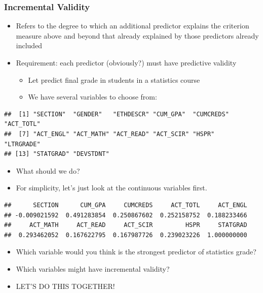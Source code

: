 \documentclass[dvipsnames]{beamer}\usepackage[]{graphicx}\usepackage[]{color}
\makeatletter
\newenvironment{kframe}{%
 \def\at@end@of@kframe{}%
 \ifinner\ifhmode%
  \def\at@end@of@kframe{\end{minipage}}%
  \begin{minipage}{\columnwidth}%
 \fi\fi%
 \def\FrameCommand##1{\hskip\@totalleftmargin \hskip-\fboxsep
 \colorbox{shadecolor}{##1}\hskip-\fboxsep
     \hskip-\linewidth \hskip-\@totalleftmargin \hskip\columnwidth}%
 \MakeFramed {\advance\hsize-\width
   \@totalleftmargin\z@ \linewidth\hsize
   \@setminipage}}%
 {\par\unskip\endMakeFramed%
 \at@end@of@kframe}
\newenvironment{knitrout}{}{} %
\makeatother
\begin{document}
\begin{frame}[fragile]
\frametitle{Incremental Validity}
\begin{itemize}
  \item Refers to the degree to which an additional predictor explains the criterion measure above and beyond that already explained by those predictors already included
  \item Requirement: each predictor (obviously?) must have predictive validity
    \begin{itemize}
      \item Let predict final grade in students in a statistics course
      \item We have several variables to choose from:
    \end{itemize}
\end{itemize}
\begin{knitrout}\scriptsize
{}\color{fgcolor}\begin{kframe}
\begin{verbatim}
##  [1] "SECTION"  "GENDER"   "ETHDESCR" "CUM_GPA"  "CUMCREDS" "ACT_TOTL"
##  [7] "ACT_ENGL" "ACT_MATH" "ACT_READ" "ACT_SCIR" "HSPR"     "LTRGRADE"
## [13] "STATGRAD" "DEVSTDNT"
\end{verbatim}
\end{kframe}
\end{knitrout}
\begin{itemize}
  \item What should we do?
\end{itemize}
\end{frame}

\begin{frame}[fragile]
\begin{itemize}
\item For simplicity, let's just look at the continuous variables first.
\end{itemize}
\begin{knitrout}\scriptsize
{}\color{fgcolor}\begin{kframe}
\begin{verbatim}
##      SECTION      CUM_GPA     CUMCREDS     ACT_TOTL     ACT_ENGL 
## -0.009021592  0.491283854  0.250867602  0.252158752  0.188233466 
##     ACT_MATH     ACT_READ     ACT_SCIR         HSPR     STATGRAD 
##  0.293462052  0.167622795  0.167987726  0.239023226  1.000000000
\end{verbatim}
\end{kframe}
\end{knitrout}
\begin{itemize}
\item Which variable would you think is the strongest predictor of statistics grade? 
\item Which variables might have incremental validity?
\item LET'S DO THIS TOGETHER!
\end{itemize}
\end{frame}
\end{document}
